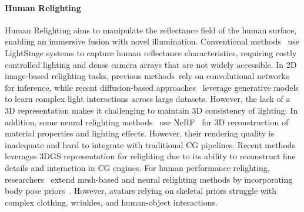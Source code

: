 \paragraph{Human Relighting}
Human Relighting aims to manipulate the reflectance field of the human surface, enabling an immersive fusion with novel illumination. Conventional methods~\cite{chabert2006relighting,debevec2012light,debevec2000acquiring,debevec2002lighting,guo2019relightables,hawkins2001photometric,wenger2005performance,weyrich2006analysis} use LightStage systems to capture human reflectance characteristics, requiring costly controlled lighting and dense camera arrays that are not widely accessible. In 2D image-based relighting tasks, previous methods~\cite{Kanamori_Endo_2018, Tajima_Kanamori_Endo_2021}rely on convolutional networks for inference, while recent diffusion-based approaches~\cite{ding2023diffusionriglearningpersonalizedpriors, Zeng_2024} leverage generative models to learn complex light interactions across large datasets. However, the lack of a 3D representation makes it challenging to maintain 3D consistency of lighting. In addition, some neural relighting methods~\cite{boss2021nerd,zhang2021nerfactor,zeng2023relighting} use NeRF~\cite{nerf} for 3D reconstruction of material properties and lighting effects. However, their rendering quality is inadequate and hard to integrate with traditional CG pipelines.
Recent methods~\cite{gao2025relightable,jiang2024gaussianshader,liang2024gs, gu2024irgs} leverages 3DGS representation for relighting due to its ability to reconstruct fine details and interaction in CG engines. 
For human performance relighting, researchers~\cite{chen2022relighting4d, xu2024relightable, li2024animatablegaussians, chen2024meshavatar, zheng2025physavatar, luvizon2024relightableneuralactorintrinsic} extend mesh-based and neural relighting methods by incorporating body pose priors~\cite{loper2023smpl, jiang2024smplx}. However, avatars relying on skeletal priors struggle with complex clothing, wrinkles, and human-object interactions.


























